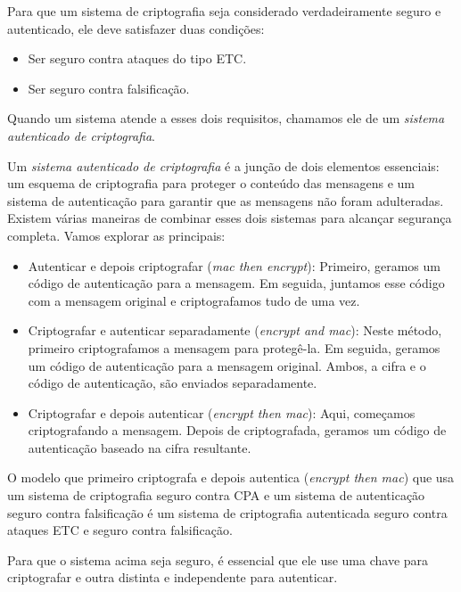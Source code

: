 Para que um sistema de criptografia seja considerado verdadeiramente seguro e autenticado, ele deve satisfazer duas condições:
\begin{itemize}
\item Ser seguro contra ataques do tipo ETC.
\item Ser seguro contra falsificação.
\end{itemize}

Quando um sistema atende a esses dois requisitos, chamamos ele de um {\em sistema autenticado de criptografia}.

Um {\em sistema autenticado de criptografia} é a junção de dois elementos essenciais:
um esquema de criptografia para proteger o conteúdo das mensagens e um sistema de autenticação para garantir que as mensagens não foram adulteradas.
Existem várias maneiras de combinar esses dois sistemas para alcançar segurança completa. Vamos explorar as principais:

\begin{itemize}
\item Autenticar e depois criptografar ({\em mac then encrypt}):
  Primeiro, geramos um código de autenticação para a mensagem.
  Em seguida, juntamos esse código com a mensagem original e criptografamos tudo de uma vez. 
\item Criptografar e autenticar separadamente ({\em encrypt and mac}):
  Neste método, primeiro criptografamos a mensagem para protegê-la.
  Em seguida, geramos um código de autenticação para a mensagem original.
  Ambos, a cifra e o código de autenticação, são enviados separadamente.
\item Criptografar e depois autenticar ({\em encrypt then mac}):
  Aqui, começamos criptografando a mensagem.
  Depois de criptografada, geramos um código de autenticação baseado na cifra resultante. 
\end{itemize}

\begin{theorem}
  O modelo que primeiro criptografa e depois autentica ({\em encrypt then mac}) que usa um sistema de criptografia seguro contra CPA e um sistema de autenticação seguro contra falsificação é um sistema de criptografia autenticada seguro contra ataques ETC e seguro contra falsificação. 
\end{theorem}

Para que o sistema acima seja seguro, é essencial que ele use uma chave para criptografar e outra distinta e independente para autenticar.

